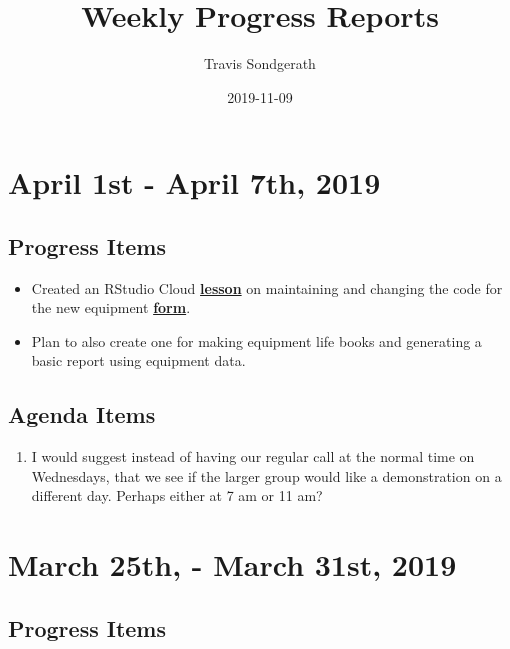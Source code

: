 \documentclass[]{article}
\title{Weekly Progress Reports}
\author{Travis Sondgerath}
\date{2019-11-09}
\providecommand{\tightlist}{%
  \setlength{\itemsep}{0pt}\setlength{\parskip}{0pt}}
\begin{document}
\maketitle

{
\setcounter{tocdepth}{2}
\tableofcontents
}
\hypertarget{april-1st---april-7th-2019}{%
\section{April 1st - April 7th, 2019}\label{april-1st---april-7th-2019}}

\hypertarget{progress-items}{%
\subsection{Progress Items}\label{progress-items}}

\begin{itemize}
\tightlist
\item
  Created an RStudio Cloud
  \textbf{\href{https://travis-shinin-spot.shinyapps.io/new_equip_form/}{lesson}}
  on maintaining and changing the code for the new equipment
  \textbf{\href{https://travis-shinin-spot.shinyapps.io/new_equip_form/}{form}}.
\item
  Plan to also create one for making equipment life books and generating
  a basic report using equipment data.
\end{itemize}

\hypertarget{agenda-items}{%
\subsection{Agenda Items}\label{agenda-items}}

\begin{enumerate}
\def\labelenumi{\arabic{enumi}.}
\tightlist
\item
  I would suggest instead of having our regular call at the normal time
  on Wednesdays, that we see if the larger group would like a
  demonstration on a different day. Perhaps either at 7 am or 11 am?
\end{enumerate}

\hypertarget{march-25th---march-31st-2019}{%
\section{March 25th, - March 31st,
2019}\label{march-25th---march-31st-2019}}

\hypertarget{progress-items-1}{%
\subsection{Progress Items}\label{progress-items-1}}
\end{document}
